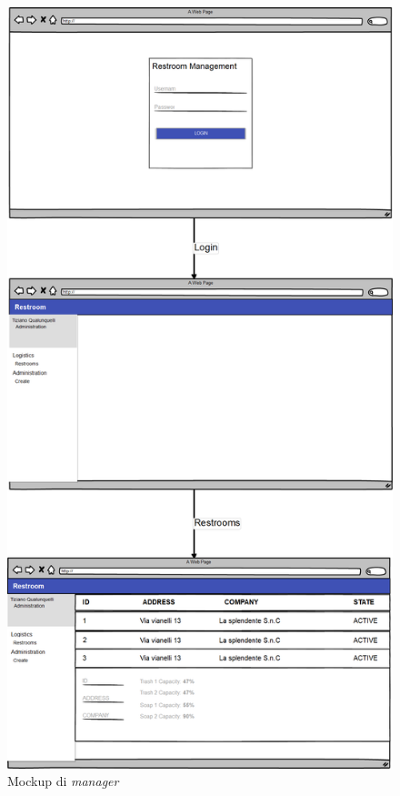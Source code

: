 \documentclass[12pt]{article}
\begin{document}
\begin{figure}
\centering
  \includegraphics[scale=0.25]{img/mockup-manager.png}
  \caption{Mockup di \textit{manager}}
\end{figure}
\end{document}

